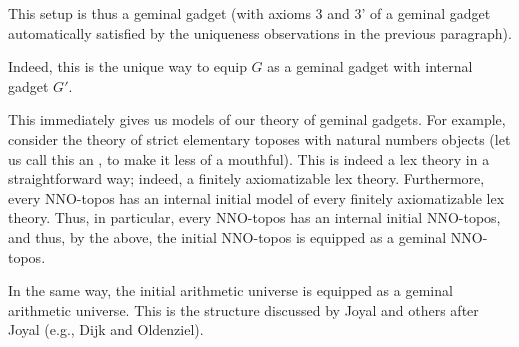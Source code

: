 This setup is thus a geminal gadget (with axioms 3 and 3' of a geminal gadget automatically satisfied by the uniqueness observations in the previous paragraph).

Indeed, this is the unique way to equip $G$ as a geminal gadget with internal gadget $G'$.

This immediately gives us models of our theory of geminal gadgets. For example, consider the theory of strict elementary toposes with natural numbers objects (let us call this an , to make it less of a mouthful). This is indeed a lex theory in a straightforward way; indeed, a finitely axiomatizable lex theory. Furthermore, every NNO-topos has an internal initial model of every finitely axiomatizable lex theory. Thus, in particular, every NNO-topos has an internal initial NNO-topos, and thus, by the above, the initial NNO-topos is equipped as a geminal NNO-topos.


In the same way, the initial arithmetic universe is equipped as a geminal arithmetic universe. This is the structure discussed by Joyal and others after Joyal (e.g., Dijk and Oldenziel). 



